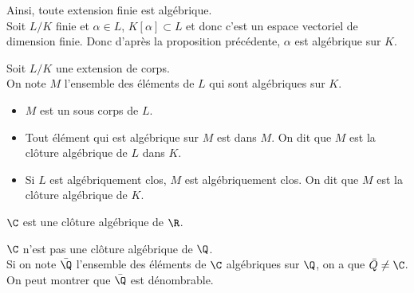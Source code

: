 \begin{remarque}
	Ainsi, toute extension finie est algébrique.\\
	Soit $L/K$ finie et $\alpha \in L$, $K[\alpha] \subset L$ et donc c'est un espace vectoriel de dimension finie. Donc d'après la proposition précédente, $\alpha$ est algébrique sur $K$.
\end{remarque}

\begin{theorem}
	Soit $L/K$ une extension de corps.\\
	On note $M$ l'ensemble des éléments de $L$ qui sont algébriques sur $K$.
	\begin{itemize}
		\item $M$ est un sous corps de $L$.
		\item Tout élément qui est algébrique sur $M$ est dans $M$. On dit que $M$ est la clôture algébrique de $L$ dans $K$.
		\item Si $L$ est algébriquement clos, $M$ est algébriquement clos. On dit que $M$ est la clôture algébrique de $K$.
	\end{itemize}
\end{theorem}



\begin{example}
	$\C$ est une clôture algébrique de $\R$.
\end{example}

\begin{example}
	$\C$ n'est pas une clôture algébrique de $\Q$. \\
	Si on note $\bar{\Q}$ l'ensemble des éléments de $\C$ algébriques sur $\Q$, on a que $\bar{Q} \neq \C$. On peut montrer que $\bar{\Q}$ est dénombrable.
\end{example}

